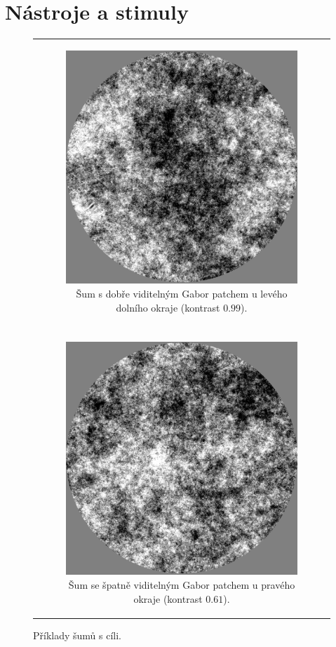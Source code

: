 \section{Nástroje a stimuly}
\begin{figure}
\begin{center}
\begin{tabular}{c}
\begin{subfigure}{0.95\textwidth}
\centering
\includegraphics[width = .75\linewidth]{img/noise_visible}
\caption{Šum s dobře viditelným Gabor patchem u levého dolního okraje (kontrast $0.99$).}
\end{subfigure}\\
\noalign{\vskip\bigskipamount}
\\
\begin{subfigure}{0.95\textwidth}
\centering
\includegraphics[width = .75\linewidth]{img/noise_invisible}
\caption{Šum se špatně viditelným Gabor patchem u pravého okraje (kontrast $0.61$).}
\end{subfigure}
\end{tabular}
\caption{Příklady šumů s cíli.}
\end{center}
\end{figure}

